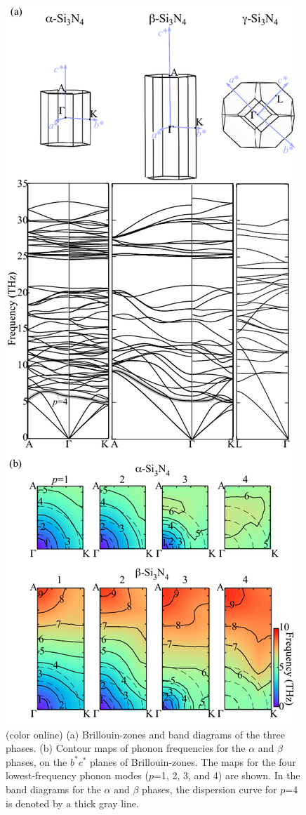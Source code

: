 \documentclass[twocolumn,amsmath,amssymb,a4paper,prb,superscriptaddress,floatfix]{revtex4-1}
\begin{document}
\begin{figure}[H]
	 \begin{center}
		   \includegraphics[width=0.90\linewidth]{Fig4_ver5_338_resize2_woDOS_color_simplified_no_symm.pdf}
		   \caption{(color online) (a) Brillouin-zones and  band diagrams of the three phases. (b) Contour maps 
			   of phonon frequencies for the $\alpha$ and $\beta$ phases, on the  $b^*c^*$  planes of Brillouin-zones. 
			   The maps for the four lowest-frequency phonon modes ($p$=1, 2, 3,
			   and 4) are shown. In the band diagrams for the $\alpha$ and
			   $\beta$ phases, the dispersion curve for $p$=4 is denoted by a thick gray line.
		   \label{fig:Fig4_ver5_338} }
    \end{center}
\end{figure}
\end{document}
